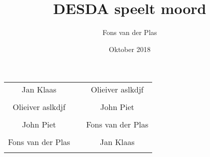 \documentclass[twocolumn]{article}
\title{DESDA speelt moord}
\author{Fons van der Plas}
\date{Oktober 2018}
\begin{document}
\twocolumn

\begin{supertabular}{c c c}
	Jan Klaas &  & Olieiver aslkdjf \\\\ 
	Olieiver aslkdjf &  & John Piet \\\\ 
	John Piet &  & Fons van der Plas \\\\ 
	Fons van der Plas &  & Jan Klaas \\\\ 
\end{supertabular}
\end{document}
